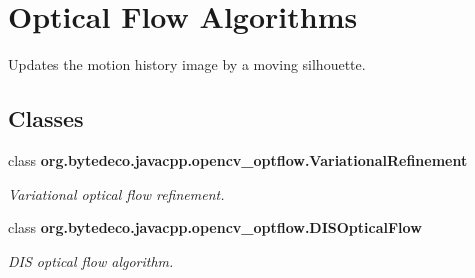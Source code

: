 \hypertarget{group__optflow}{}\section{Optical Flow Algorithms}
\label{group__optflow}


Updates the motion history image by a moving silhouette.  


\subsection*{Classes}
\begin{DoxyCompactItemize}
\item 
class {\bfseries org.\+bytedeco.\+javacpp.\+opencv\+\_\+optflow.\+Variational\+Refinement}
\begin{DoxyCompactList}\small\item\em Variational optical flow refinement. \end{DoxyCompactList}\item 
class {\bfseries org.\+bytedeco.\+javacpp.\+opencv\+\_\+optflow.\+D\+I\+S\+Optical\+Flow}
\begin{DoxyCompactList}\small\item\em D\+IS optical flow algorithm. \end{DoxyCompactList}\end{DoxyCompactItemize}
